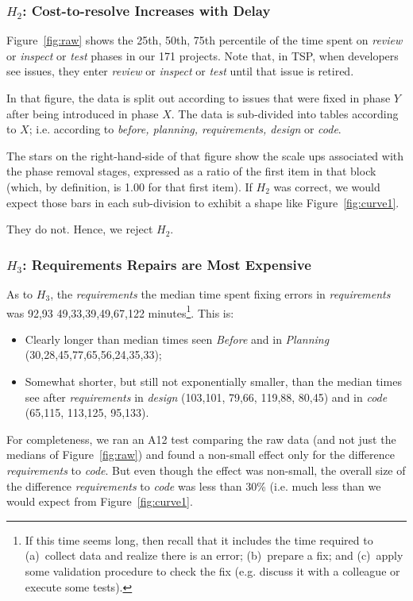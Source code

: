 \documentclass{sig-alternate}
\newcommand{\bi}{\begin{itemize}[leftmargin=0.4cm]}
\newcommand{\ei}{\end{itemize}}
\newcommand{\fig}[1]{Figure~\ref{fig:#1}}
\begin{document}
 \subsubsection{$H_2$: Cost-to-resolve Increases with Delay}

%
\fig{raw} shows the 25th, 50th, 75th percentile
of the time spent on {\em review} or {\em inspect} or {\em test} phases
in our 171 projects.
Note that, in TSP, when developers see issues, they enter {\em review} or 
{\em inspect} or {\em test}
until that issue is retired.

In that figure, the data is split out according to issues that were fixed in phase $Y$ after
being introduced in phase $X$. The data is sub-divided into tables according to $X$;
i.e. according to {\em before, planning, requirements, design} or {\em  code}. 

The stars on the right-hand-side of that figure show the scale ups associated with the phase removal stages,
expressed as a ratio of the first item in that block (which, by definition, is 1.00 for
that first item).
If $H_2$ was correct, we would expect those bars in each sub-division to exhibit a  shape
like \fig{curve1}. 

They do not. Hence, we reject $H_2$.


 \subsubsection{$H_3$: Requirements Repairs are Most Expensive}
 
As to $H_3$, the {\em requirements} the  median time spent fixing errors in {\em requirements} was 92,93  49,33,39,49,67,122 minutes\footnote{If this time seems long, then recall
that it includes the time required  to (a)~collect data and realize there is an error;
(b)~prepare a fix;  and (c)~apply some validation
procedure to check the fix (e.g. discuss it with a colleague or execute some tests).}.
This is:
\bi
\item
Clearly longer than median times seen {\em Before } and in {\em Planning}
(30,28,45,77,65,56,24,35,33);
\item
Somewhat shorter, but still not exponentially smaller,  than the median times see after {\em requirements} in {\em design}
(103,101, 79,66, 119,88, 80,45) and in {\em code} (65,115, 113,125, 95,133). 
\ei
For completeness, we ran an  
A12 test comparing the raw data (and not just the medians of \fig{raw}) and found
 a non-small effect only for the difference {\em requirements}
to {\em code}. But even though the effect was non-small, 
 the overall size of the difference
{\em requirements} to {\em code} was less than 30\% (i.e. much less than we would
expect from \fig{curve1}. 
\end{document}
